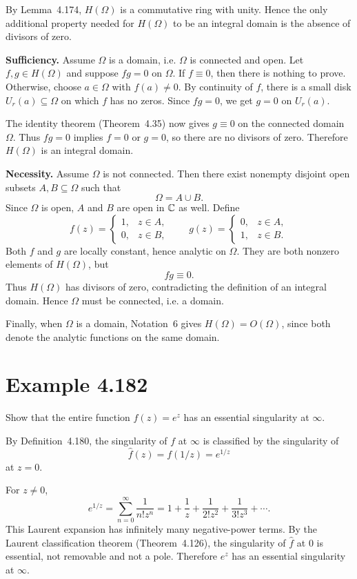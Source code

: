 \documentclass{article}
\begin{document}
\begin{solution}
  By Lemma~4.174, $H(\Omega)$ is a commutative ring with unity. Hence the
  only additional property needed for $H(\Omega)$ to be an integral domain is
  the absence of divisors of zero.

  \medskip
  \noindent\textbf{Sufficiency.}
  Assume $\Omega$ is a domain, i.e. $\Omega$ is connected and open. Let
  $f,g\in H(\Omega)$ and suppose $fg=0$ on $\Omega$.
  If $f\equiv 0$, then there is nothing to prove. Otherwise, choose
  $a\in\Omega$ with $f(a)\ne 0$. By continuity of $f$, there is a small disk
  $U_r(a)\subseteq \Omega$ on which $f$ has no zeros. Since $fg=0$, we get
  $g=0$ on $U_r(a)$.

  The identity theorem (Theorem~4.35) now gives $g\equiv 0$ on the connected
  domain $\Omega$. Thus $fg=0$ implies $f=0$ or $g=0$, so there are no
  divisors of zero. Therefore $H(\Omega)$ is an integral domain.

  \medskip
  \noindent\textbf{Necessity.}
  Assume $\Omega$ is not connected. Then there exist nonempty disjoint open
  subsets $A,B\subseteq\Omega$ such that
  \[
    \Omega=A\cup B.
  \]
  Since $\Omega$ is open, $A$ and $B$ are open in $\mathbb{C}$ as well. Define
  \[
    f(z)=
    \begin{cases}
      1,& z\in A,\\
      0,& z\in B,
    \end{cases}
    \qquad
    g(z)=
    \begin{cases}
      0,& z\in A,\\
      1,& z\in B.
    \end{cases}
  \]
  Both $f$ and $g$ are locally constant, hence analytic on $\Omega$. They are
  both nonzero elements of $H(\Omega)$, but
  \[
    fg\equiv 0.
  \]
  Thus $H(\Omega)$ has divisors of zero, contradicting the definition of an
  integral domain. Hence $\Omega$ must be connected, i.e. a domain.

  Finally, when $\Omega$ is a domain, Notation~6 gives
  $H(\Omega)=O(\Omega)$, since both denote the analytic functions on the same
  domain.
\end{solution}

\section{Example 4.182}

Show that the entire function $f(z)=e^z$ has an essential singularity at
$\infty$.

\begin{solution}
  By Definition~4.180, the singularity of $f$ at $\infty$ is classified by
  the singularity of
  \[
    \widehat f(z)=f(1/z)=e^{1/z}
  \]
  at $z=0$.

  For $z\ne 0$,
  \[
    e^{1/z}
    =
    \sum_{n=0}^{\infty}\frac{1}{n!z^n}
    =
    1+\frac1z+\frac{1}{2!z^2}+\frac{1}{3!z^3}+\cdots .
  \]
  This Laurent expansion has infinitely many negative-power terms. By the
  Laurent classification theorem (Theorem~4.126), the singularity of
  $\widehat f$ at $0$ is essential, not removable and not a pole.
  Therefore $e^z$ has an essential singularity at $\infty$.
\end{solution}
\end{document}
